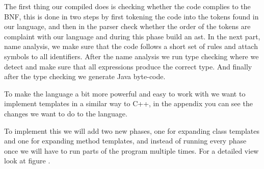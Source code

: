 \iffalse
We want to implement templates in a similar way to C++, in the appendix you can
see the changes we want to do to the language.

To implement this we will add a new phase between the name analysis and type
checking to expand the templates with the needed types. If we for example define
a method \textbf{max$\langle$T$\rangle$(a:T,b:T):T} and call it with a pair of
Ints and a pair of Strings we need to expand the code into one method for ints
and one for strings, for example \textbf{max\$Int(a:Int,b:Int):Int}.

This in addition to adding a new Type or Symbol for templates is all the
changes we think are necessary for implementing templates. In particular, the
type checking and code generation phases should not need to be modified since
we will require explicit type arguments in references to template types and
methods. Automatic inference of type parameters where possible is proposed as a
further extension if we get the time.

In the name analysis phase we simply add a template symbol to all references to
templates, and in the phase before type checking we expand the template by adding
any needed classes and methods to the AST. The template symbol contains a list of
either methodSymbols or classSymbols for all the versions that has been created.
\fi

\iftrue
The first thing our compiled does is checking whether the code complies to
the BNF, this is done in two steps by first tokening the code into the
tokens found in our language, and then in the parser check whether the order
of the tokens are complaint with our language and during this phase build an ast.
In the next part, name analysis, we make sure that the code follows a short set
of rules and attach symbols to all identifiers. After the name analysis we run type
checking where we detect and make sure that all expressions produce the correct
type. And finally after the type checking we generate Java byte-code.

To make the language a bit more powerful and easy to work with we want to
implement templates in a similar way to C++, in the appendix you can
see the changes we want to do to the language.

To implement this we will add two new phases, one for expanding class templates
and one for expanding method templates, and instead of running every phase once
we will have to run parts of the program multiple times. For a detailed view
look at figure .

\fi
